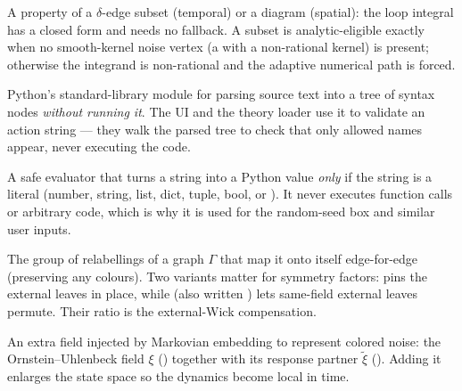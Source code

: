 \begin{description}[leftmargin=0pt,style=nextline]
  \item[\code{analytic-eligible}] A property of a $\delta$-edge subset (temporal)
        or a diagram (spatial): the loop integral has a closed form and needs no
         fallback. A subset is analytic-eligible exactly when no
        smooth-kernel noise vertex (a  with a non-rational
        kernel) is present; otherwise the integrand is non-rational and the
        adaptive numerical path is forced.

  \item[\code{ast} (Abstract Syntax Tree)] Python's standard-library module for
        parsing source text into a tree of syntax nodes \emph{without running it}.
        The UI and the theory loader use it to validate an action string --- they
        walk the parsed tree to check that only allowed names appear, never
        executing the code.

  \item[\code{ast.literal\_eval}] A safe evaluator that turns a string into a
        Python value \emph{only} if the string is a literal (number, string, list,
        dict, tuple, bool, or ). It never executes function calls or
        arbitrary code, which is why it is used for the random-seed box and similar
        user inputs.

  \item[Automorphism group $\Aut(\Gamma)$] The group of relabellings of a graph
        $\Gamma$ that map it onto itself edge-for-edge (preserving any colours).
        Two variants matter for symmetry factors:  pins the
        external leaves in place, while  (also written
        ) lets same-field external leaves permute. Their ratio is
        the external-Wick compensation.

  \item[Auxiliary field (aux field)] An extra field injected by Markovian
        embedding to represent colored noise: the Ornstein--Uhlenbeck field
        $\xi$ () together with its \msrjd{} response partner
        $\tilde\xi$ (). Adding it enlarges the state space so the dynamics
        become local in time.

\end{description}

